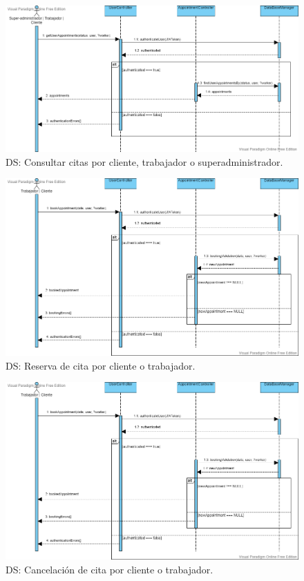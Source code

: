 \begin{figure}[H]
  \centering
  \includegraphics[scale=0.38]{images/Consultar_citas.png}
  \caption{DS: Consultar citas por cliente, trabajador o superadministrador.}
  \label{DS1}
\end{figure}

\begin{figure}[H]
  \centering
  \includegraphics[scale=0.36]{images/Rerservar_cita.png}
  \caption{DS: Reserva de cita por cliente o trabajador.}
  \label{DS1}
\end{figure}

\begin{figure}[H]
  \centering
  \includegraphics[scale=0.36]{images/Rerservar_cita.png}
  \caption{DS: Cancelación de cita por cliente o trabajador.}
  \label{DS1}
\end{figure}


